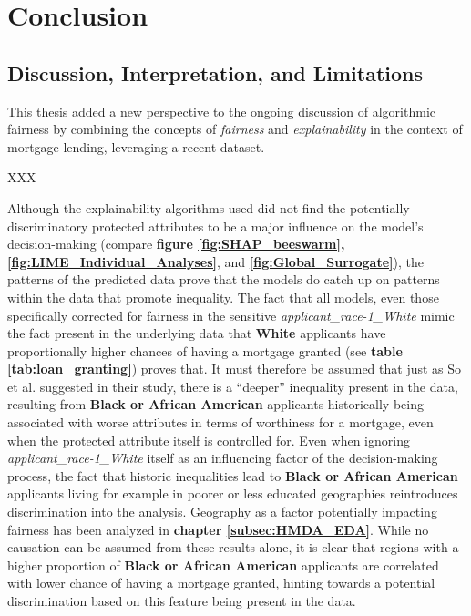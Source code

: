 \chapter{Conclusion}\label{ch:discussion}

\section{Discussion, Interpretation, and Limitations}\label{sec:discussion}


This thesis added a new perspective to the ongoing discussion of algorithmic fairness by combining the concepts of \textit{fairness} and \textit{explainability} in the context of mortgage lending, leveraging a recent dataset.

XXX

Although the explainability algorithms used did not find the potentially discriminatory protected attributes to be a major influence on the model’s decision-making (compare \textbf{figure \ref{fig:SHAP_beeswarm}, \ref{fig:LIME_Individual_Analyses}}, and \textbf{\ref{fig:Global_Surrogate}}), the patterns of the predicted data prove that the models do catch up on patterns within the data that promote inequality. 
The fact that all models, even those specifically corrected for fairness in the sensitive \textit{applicant\_race-1\_White} mimic the fact present in the underlying data that \textbf{White} applicants have proportionally higher chances of having a mortgage granted (see \textbf{table \ref{tab:loan_granting}}) proves that. 
It must therefore be assumed that just as So et al. \parencite{So2022} suggested in their study, there is a “deeper” inequality present in the data, resulting from \textbf{Black or African American} applicants historically being associated with worse attributes in terms of worthiness for a mortgage, even when the protected attribute itself is controlled for.
Even when ignoring \textit{applicant\_race-1\_White} itself as an influencing factor of the decision-making process, the fact that historic inequalities lead to \textbf{Black or African American} applicants living for example in poorer or less educated geographies reintroduces discrimination into the analysis.
Geography as a factor potentially impacting fairness has been analyzed in \textbf{chapter \ref{subsec:HMDA_EDA}}. While no causation can be assumed from these results alone, it is clear that regions with a higher proportion of \textbf{Black or African American} applicants are correlated with lower chance of having a mortgage granted, hinting towards a potential discrimination based on this feature being present in the data.

